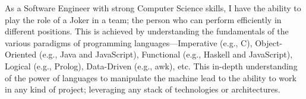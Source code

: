 As a Software Engineer with strong Computer Science skills,
I have the ability to play the role of a Joker in a team;
the person who can perform efficiently in different positions.
This is achieved by understanding the fundamentals of the various paradigms of programming languages---Imperative (e.g., C),
Object-Oriented (e.g., Java and JavaScript), Functional (e.g., Haskell and JavaScript), Logical (e.g., Prolog), Data-Driven (e.g., awk), etc.
This in-depth understanding of the power of languages to manipulate the machine lead to the ability
to work in any kind of project; leveraging any stack of technologies or architectures.
